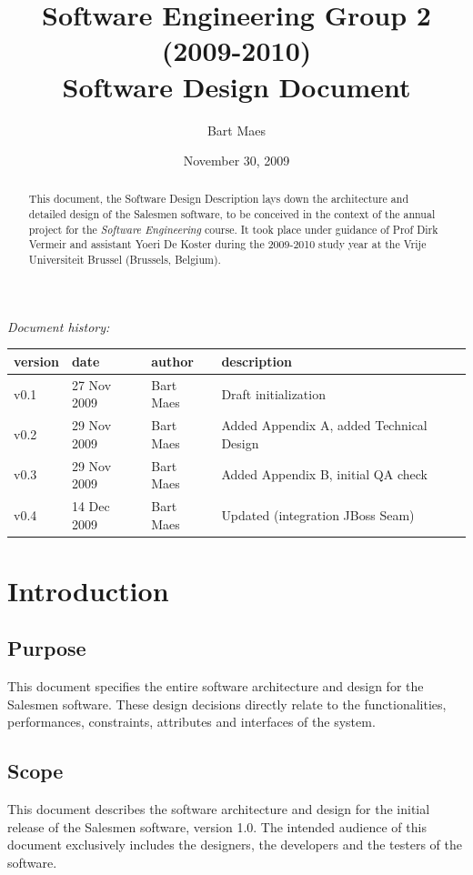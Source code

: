 \documentclass[a4paper, 12pt]{report}
\title{Software Engineering Group 2 (2009-2010) \\Software Design Document}
\author{Bart Maes}
\date {November 30, 2009}
\begin{document}
\maketitle

\thispagestyle{empty}



\begin{abstract}
This document, the Software Design Description lays down the architecture and detailed design of the Salesmen software, to be conceived in the context of the annual project for the \emph{Software Engineering} course. It took place under guidance of Prof Dirk Vermeir and assistant Yoeri De Koster during the 2009-2010 study year at the Vrije Universiteit Brussel (Brussels, Belgium).
\end{abstract}

\begin{center}
\emph{Document history:}\\
\begin{tabular}{llll}
version & date & author & description \\
\hline
v0.1 & 27 Nov 2009 & Bart Maes & Draft initialization \\
v0.2 & 29 Nov 2009 & Bart Maes & Added Appendix A, added Technical Design\\
v0.3 & 29 Nov 2009 & Bart Maes & Added Appendix B, initial QA check\\
v0.4 & 14 Dec 2009 & Bart Maes & Updated (integration JBoss Seam)\\
\end{tabular}
\end{center}

\newpage
\tableofcontents
\newpage

\chapter{Introduction}

\section{Purpose}
   This document specifies the entire software architecture and design for the Salesmen software. These design decisions directly relate to the functionalities, performances, constraints, attributes and interfaces of the system.

\section{Scope}
    This document describes the software architecture and design for the initial release of the Salesmen software, version 1.0. The intended audience of this document exclusively includes the designers, the developers and the testers of the software.
\end{document}
